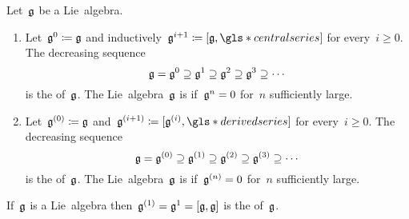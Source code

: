 \begin{definition}
  Let~$\mathfrak{g}$ be a Lie~algebra.
  \begin{enumerate}
    \item
      Let~$\mathfrak{g}^0 \coloneqq \mathfrak{g}$ and inductively~$\glie^{i+1} \defined [\glie, \gls*{central series}]$ for every~$i \geq 0$.
      The decreasing sequence
      \[
        \mathfrak{g}
        =
        \mathfrak{g}^0
        \supseteq
        \mathfrak{g}^1
        \supseteq
        \mathfrak{g}^2
        \supseteq
        \mathfrak{g}^3
        \supseteq
        \dotsb
      \]
      is the  of~$\mathfrak{g}$.
      The Lie~algebra~$\mathfrak{g}$ is  if~$\mathfrak{g}^n = 0$ for~$n$ sufficiently large.
    \item
      Let~$\mathfrak{g}^{(0)} \coloneqq \mathfrak{g}$ and~$\glie^{(i+1)} \defined [\glie^{(i)}, \gls*{derived series}]$ for every~$i \geq 0$.
      The decreasing sequence
      \[
        \mathfrak{g}
        =
        \mathfrak{g}^{(0)}
        \supseteq
        \mathfrak{g}^{(1)}
        \supseteq
        \mathfrak{g}^{(2)}
        \supseteq
        \mathfrak{g}^{(3)}
        \supseteq
        \dotsb
      \]
      is the  of~$\mathfrak{g}$.
      The Lie~algebra~$\mathfrak{g}$ is  if~$\mathfrak{g}^{(n)} = 0$ for~$n$ sufficiently large.
  \end{enumerate}
\end{definition}


\begin{definition}
  If~$\mathfrak{g}$ is a Lie~algebra then~$\mathfrak{g}^{(1)} = \mathfrak{g}^1 = [\mathfrak{g}, \mathfrak{g}]$ is the  of~$\mathfrak{g}$.
\end{definition}


